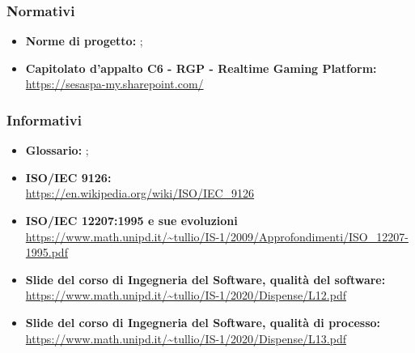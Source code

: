 		\subsubsection{Normativi}
		\begin{itemize}
			\item \textbf{Norme di progetto:} ;
			\item \textbf{Capitolato d’appalto C6 - RGP - Realtime Gaming Platform:}\\
			\href{https://sesaspa-my.sharepoint.com/personal/s_dindo_vargroup_it/_layouts/15/onedrive.aspx?id=\%2Fpersonal\%2Fs\%5Fdindo\%5Fvargroup\%5Fit\%2FDocuments\%2FDownload\%2Fupload\%2FIngegneria\%5Fsoftware\%2FCapitolato\%5FIngegneria\%5Fsoftware\%2Epdf\&parent=\%2Fpersonal\%2Fs\%5Fdindo\%5Fvargroup\%5Fit\%2FDocuments\%2FDownload\%2Fupload\%2FIngegneria\%5Fsoftware\&originalPath=aHR0cHM6Ly9zZXNhc3BhLW15LnNoYXJlcG9pbnQuY29tLzpiOi9nL3BlcnNvbmFsL3NfZGluZG9fdmFyZ3JvdXBfaXQvRVRodmF5MGY2S1ZDb1h5ZFlPY2UybGtCdC1NWWNuVzF5YWZSWEZYVklPSXNIZz9ydGltZT1jQjNzY3NxczJFZw}{https://sesaspa-my.sharepoint.com/}
		\end{itemize}
		\subsubsection{Informativi}
		\begin{itemize}
			\item \textbf{Glossario:} ;
			\item \textbf{ISO/IEC 9126:}\\
			\url{https://en.wikipedia.org/wiki/ISO/IEC_9126}
			
			\item \textbf{ISO/IEC 12207:1995 e sue evoluzioni}\\
			\url{https://www.math.unipd.it/~tullio/IS-1/2009/Approfondimenti/ISO_12207-1995.pdf}
			
			\item \textbf{Slide del corso di Ingegneria del Software, qualità del software:}\\
			\url{https://www.math.unipd.it/~tullio/IS-1/2020/Dispense/L12.pdf}
			
			\item \textbf{Slide del corso di Ingegneria del Software, qualità di processo:}\\
			\url{https://www.math.unipd.it/~tullio/IS-1/2020/Dispense/L13.pdf}
		
		\end{itemize}
	